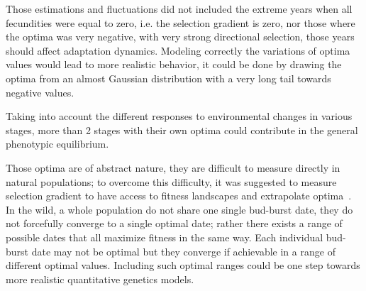 Those estimations and fluctuations did not included the extreme years when all fecundities were equal to zero, i.e. the selection gradient is zero, nor those where the optima was very negative, with very strong directional selection, those years should affect adaptation dynamics. Modeling correctly the variations of optima values would lead to more realistic behavior, it could be done by drawing the optima from an almost Gaussian distribution with a very long tail towards negative values.

Taking into account the different responses to environmental changes in various stages, more than 2 stages with their own optima could contribute in the general phenotypic equilibrium.

Those optima are of abstract nature, they are difficult to measure directly in natural populations; to overcome this difficulty, it was suggested to measure selection gradient to have access to fitness landscapes and extrapolate optima~\citep{lynch_evolution_1993}. In the wild, a whole population do not share one single bud-burst date, they do not forcefully converge to a single optimal date; rather there exists a range of possible dates that all maximize fitness in the same way. Each individual bud-burst date may not be optimal but they converge if achievable in a range of different optimal values. Including such optimal ranges could be one step towards more realistic quantitative genetics models.